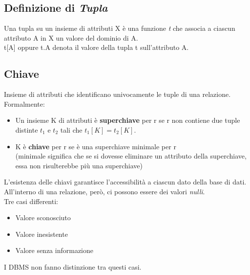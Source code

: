 \documentclass[12pt, a4paper]{article}
\begin{document}
    \newpage
    \subsection*{Definizione di \textit{Tupla}}
    Una tupla su un insieme di attributi X è una funzione \textit{t} che associa a ciascun attributo A in X
    un valore del dominio di A.
    \\t[A] oppure t.A denota il valore della tupla t sull'attributo A.


    \subsection*{Chiave}
    Insieme di attributi che identificano univocamente le tuple di una relazione.
    \\Formalmente:
    \begin{itemize}
        \item Un insieme K di attributi è \textbf{superchiave} per r se r non contiene
        due tuple distinte $t_1$ e $t_2$ tali che $t_1[K] = t_2[K]$.
        \item K è \textbf{chiave} per r se è una superchiave minimale per r
        \\(minimale significa che se si dovesse eliminare un attributo della superchiave, essa 
        non risulterebbe più una superchiave)
        \\
    \end{itemize}
    L'esistenza delle chiavi garantisce l'accessibilità a ciascun dato della base di dati.
    \newpage
    All'interno di una relazione, però, ci possono essere dei valori \textit{nulli}.
    \\Tre casi differenti: 
    \begin{itemize}
        \item Valore sconosciuto
        \item Valore inesistente
        \item Valore senza informazione
    \end{itemize}

    I DBMS non fanno distinzione tra questi casi.
\end{document}
